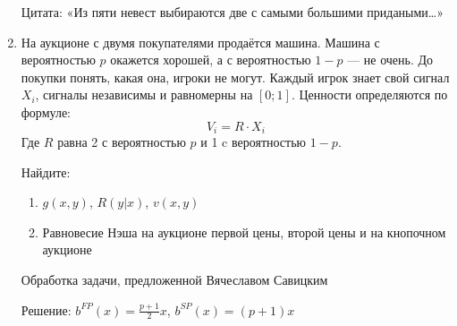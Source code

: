 \begin{enumerate}
Цитата: «Из пяти невест выбираются две с самыми большими придаными\ldots»

\item На аукционе с двумя покупателями продаётся машина. Машина с вероятностью $p$ окажется хорошей, а с вероятностью $1-p$ — не очень. До покупки понять, какая она, игроки не могут. Каждый игрок знает свой сигнал $X_{i}$, сигналы независимы и равномерны на $[0;1]$. Ценности определяются по формуле:
\begin{equation}
V_{i}=R\cdot X_{i}
\end{equation}
Где $R$ равна 2 с вероятностью $p$ и 1 c вероятностью $1-p$.

Найдите:
\begin{enumerate}
\item $g(x,y)$, $R(y|x)$, $v(x,y)$
\item Равновесие Нэша на аукционе первой цены, второй цены и на кнопочном аукционе
\end{enumerate}

Обработка задачи, предложенной Вячеславом Савицким

Решение: $b^{FP}(x)=\frac{p+1}{2}x$, $b^{SP}(x)=(p+1)x$


\end{enumerate}
